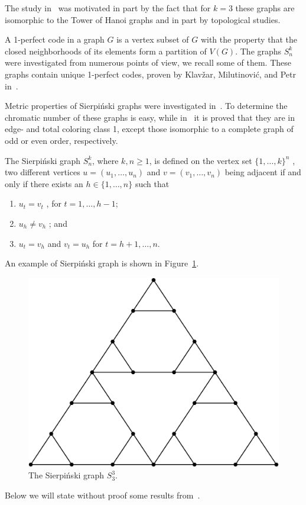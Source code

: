\documentclass[12pt,a4paper,titlepage,openany]{report}
\begin{document}
The study in~\cite{Sandi2} was motivated in part by the fact that for $k=3$ these graphs are isomorphic to the Tower of Hanoi graphs and in part by topological studies.

A 1-perfect code in a graph $G$ is a vertex subset of $G$ with the property that the closed neighborhoods of its elements form a partition of $V(G)$. The graphs $S^k_n$ were investigated from numerous points of view, we recall some of them. These graphs contain unique 1-perfect codes, proven by Klav\v zar, Milutinovi\' c, and Petr in~\cite{Ciril}.

Metric properties of Sierpi\'nski graphs were investigated in~\cite{Andreas}. To
determine the chromatic number of these graphs is easy, while in~\cite{Andreas2} it is proved that they are in
edge- and total coloring class 1, except those isomorphic to a complete graph of odd or even order, respectively.

The Sierpi\'nski graph $S^k_n$, where $k,n\geq 1$, is defined on the vertex set $\{ 1,\ldots,k \}^n$ , two different vertices $u = (u_1 ,\ldots, u_n )$ and $v = (v_1 ,\ldots , v_n)$ being adjacent if and only if there exists an $h \in \{ 1 , \ldots, n \}$ such that
\begin{enumerate}[label=(\roman*)]
\item $u_t = v_t$ , for $t = 1 ,\ldots , h-1$;
\item $u_h \neq v_h$ ; and
\item $u_t = v_h$ and $v_t = u_h$ for $t = h+1 ,\ldots, n$.
\end{enumerate}
An example of Sierpi\'nski graph is shown in Figure~\ref{fig:spierpinski}.
\begin{figure}[h]
\begin{center}
\includegraphics[width=1\linewidth]{figures/sierpinski.png}
\end{center}
\caption{The Sierpi\'nski graph $S^3_3$.}\label{fig:spierpinski}
\end{figure}
Below we will state without proof some results from~\cite{Sandi}.
\end{document}
